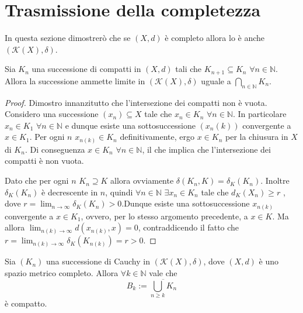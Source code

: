 \section{Trasmissione della completezza}



In questa sezione dimostrerò che se $(X,d)$ è completo allora lo è anche $(\mathcal{K}(X),\delta ) $.


\begin{lemma} \label {dioladro}
Sia $K_n$ una successione di compatti in $(X,d)$ tali che $K_{n+1}\subseteq K_n$ $ \forall n \in \mathbb{N}$. Allora la successione ammette limite in $(\mathcal{K}(X),\delta ) $ uguale a $ \bigcap_{n \in \mathbb{N}}K_n $.
\end{lemma}

\begin{proof}
Dimostro innanzitutto che l'intersezione dei compatti non è vuota. Considero una successione $(x_n) \subseteq X$ tale che $x_n \in K_n$ $ \forall n \in \mathbb{N}$. In particolare  $x_n \in K_1$ $ \forall n \in \mathbb{N}$ e dunque esiste una sottosuccessione  $(x_n(k))$ convergente a $x\in K_1$. Per ogni $n$  $x_{n(k)}\in K_n$ definitivamente, ergo $x\in K_n$ per la chiusura in $X$ di $K_n$. Di conseguenza $x \in K_n$ $ \forall n \in \mathbb{N}$, il che implica che l'intersezione dei compatti è non vuota.

Dato che per ogni $n$ $K_n\supseteq K$ allora ovviamente $\delta (K_n,K)=\delta_{K}(K_n)$. Inoltre $\delta_{K}(K_n)$ è decrescente in $n$, quindi $ \forall n \in \mathbb{N}$ $\exists x_n \in K_n$ tale che $d_K(X_n)\geq r$ , dove $r=\lim_{n \to \infty}\delta_{K}(K_n)>0$.Dunque esiste una sottosuccessione $x_{n(k)}$ convergente a $x\in K_1$, ovvero, per lo stesso argomento precedente, a  $x\in K$. Ma allora $\lim_{n(k) \to \infty}d(x_{n(k)},x)=0$, contraddicendo il fatto che $r=\lim_{n(k) \to \infty}\delta_{K}(K_{n(k)})=r>0$.
\end{proof}

\begin{theorem}
Sia $(K_n)$ una successione di Cauchy in $(\mathcal{K}(X),\delta ) $, dove $(X, d)$ è uno spazio metrico completo. Allora $\forall k \in \mathbb{N}$ vale che
\begin{equation*}
B_k:=\overline{\bigcup_{n\geq k} K_n}
\end{equation*}
è compatto.
\end{theorem}

